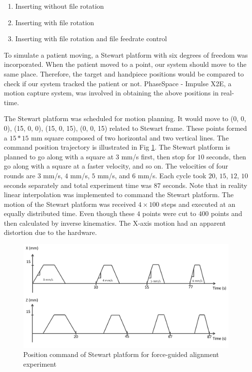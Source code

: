 \begin{enumerate}
\item[1.1] Inserting without file rotation
\item[1.2] Inserting with file rotation
\item[1.3] Inserting with file rotation and file feedrate control
\end{enumerate}
\par
To simulate a patient moving, a Stewart platform with six degrees of freedom was incorporated.  When the patient moved to a point, our system should move to the same place. Therefore, the target and handpiece positions would be compared to check if our system tracked the patient or not. PhaseSpace - Impulse X2E, a motion capture system, was involved in obtaining the above positions in real-time. 
\par
The Stewart platform was scheduled for motion planning. It would move to (0, 0, 0), (15, 0, 0), (15, 0, 15), (0, 0, 15) related to Stewart frame. These points formed a $15*15$ mm square composed of two horizontal and two vertical lines. The command position trajectory is illustrated in Fig \ref{fig: position command}. The Stewart platform is planned to go along with a square at $3$ mm/s first, then stop for $10$ seconds, then go along with a square at a faster velocity, and so on. The velocities of four rounds are $3$ mm/s, $4$ mm/s, $5$ mm/s, and $6$ mm/s. Each cycle took $20$, $15$, $12$, $10$ seconds separately and total experiment time was $87$ seconds. Note that in reality linear interpolation was implemented to command the Stewart platform. The motion of the Stewart platform was received $4 \times 100$ steps and executed at an equally distributed time. Even though these $4$ points were cut to $400$ points and then calculated by inverse kinematics. The X-axis motion had an apparent distortion due to the hardware.
\begin{figure}[htbp]
\begin{center}
\includegraphics[width=1\linewidth]{Images/position command.png}
\caption{Position command of Stewart platform for force-guided alignment experiment}
\label{fig: position command}
\end{center}
\end{figure}	
